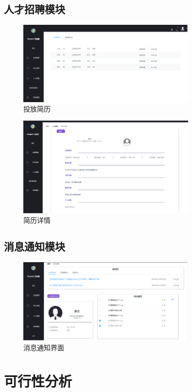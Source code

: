 \documentclass[UTF8]{ctexart}
\begin{document}
\subsection{人才招聘模块}
\begin{figure}[H]
	\centering
	\includegraphics[width=0.8\textwidth]{10.png}
	\caption{投放简历}
\end{figure}
\begin{figure}[H]
	\centering
	\includegraphics[width=0.8\textwidth]{11.png}
	\caption{简历详情}
\end{figure}
\subsection{消息通知模块}
\begin{figure}[H]
	\centering
	\includegraphics[width=0.8\textwidth]{12.png}
	\caption{消息通知界面}
\end{figure}
\newpage\section{可行性分析}
\end{document}
